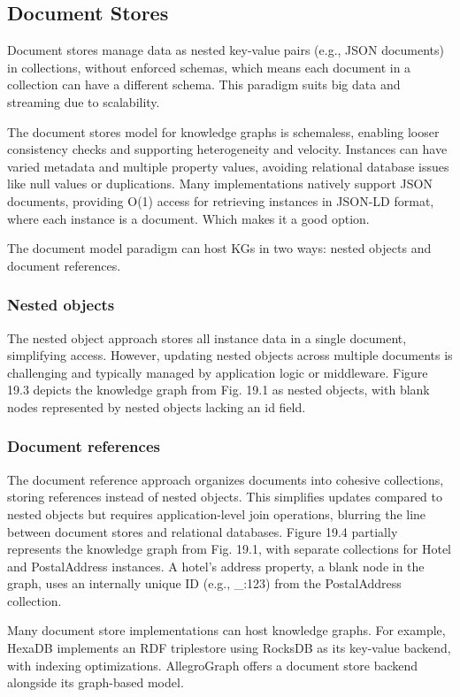 \documentclass[12pt]{article}
\begin{document}
\subsection{Document Stores}
Document stores manage data as nested key-value pairs (e.g., JSON documents) in collections, without enforced schemas, which means each document in a collection can have a different schema. This paradigm suits big data and streaming due to scalability. 

The document stores model for knowledge graphs is schemaless, enabling looser consistency checks and supporting heterogeneity and velocity. Instances can have varied metadata and multiple property values, avoiding relational database issues like null values or duplications. Many implementations natively support JSON documents, providing O(1) access for retrieving instances in JSON-LD format, where each instance is a document. Which makes it a good option.

The document model paradigm can host KGs in two ways: nested objects and document references.
\subsubsection{Nested objects}
The nested object approach stores all instance data in a single document, simplifying access. However, updating nested objects across multiple documents is challenging and typically managed by application logic or middleware. Figure 19.3 depicts the knowledge graph from Fig. 19.1 as nested objects, with blank nodes represented by nested objects lacking an id field.
\subsubsection{Document references}
The document reference approach organizes documents into cohesive collections, storing references instead of nested objects. This simplifies updates compared to nested objects but requires application-level join operations, blurring the line between document stores and relational databases. Figure 19.4 partially represents the knowledge graph from Fig. 19.1, with separate collections for Hotel and PostalAddress instances. A hotel's address property, a blank node in the graph, uses an internally unique ID (e.g., \_:123) from the PostalAddress collection.

Many document store implementations can host knowledge graphs. For example, HexaDB implements an RDF triplestore using RocksDB as its key-value backend, with indexing optimizations. AllegroGraph offers a document store backend alongside its graph-based model.
\end{document}
